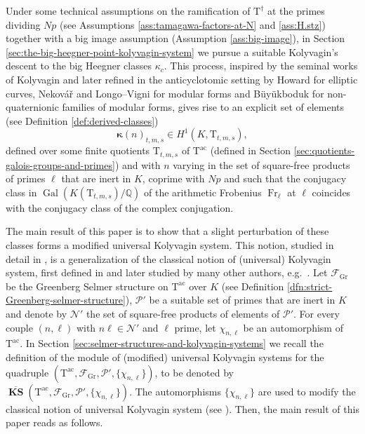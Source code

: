 \documentclass[12pt,reqno]{amsart}
\theoremstyle{definition}
\theoremstyle{remark}
\newcommand{\numberset}{\mathbb}
\newcommand{\Q}{\numberset{Q}}
\newcommand{\T}{\boldsymbol{\mathrm{T}}}
\DeclareMathOperator{\Gal}{Gal}
\DeclareMathOperator{\Fr}{Fr}
\DeclareMathOperator{\ks}{KS}
\newcommand{\KS}{\boldsymbol{\ks}}
\newcommand{\ac}{\mathrm{ac}}
\newcommand{\Gr}{\mathrm{Gr}}
\newcommand{\gk}{\kappa}
\begin{document}
Under some technical assumptions on the ramification of $\T^\dag$ at the primes dividing $Np$ (see Assumptions \ref{ass:tamagawa-factors-at-N} and \ref{ass:H.stz}) together with a big image assumption (Assumption \ref{ass:big-image}), in Section \ref{sec:the-big-heegner-point-kolyvagin-system} we pursue a suitable Kolyvagin's descent to the big Heegner classes $\kappa_c$. This process, inspired by the seminal works of Kolyvagin \cite{Kolyvagin:euler-systems, Kolyvagin:finiteness-of-E-and-sha, Kolyvagin-Logachev:finiteness-of-Sha} and later refined in the anticyclotomic setting by Howard \cite{Howard04:heegner-point-kolyvagin-system} for elliptic curves, Nekov{\'a}{\v{r}} \cite{Nekovar92:chow-groups} and Longo--Vigni \cite{Longo-Vigni:kolyvagin-systems-Heegner-cycles} for modular forms and B{\"u}y{\"u}kboduk \cite{Buyukboduk:big-Heegner-point-kolyvagin-system} for non-quaternionic families of modular forms, gives rise to an explicit set of elements (see Definition \ref{def:derived-classes})
\begin{equation}\label{eq:introduction-classes}
    \boldsymbol{\gk}(n)_{t,m,s}\in H^1(K,\T_{t,m,s}),
\end{equation}
defined over some finite quotients $\T_{t,m,s}$ of $\T^\ac$ (defined in Section \ref{sec:quotients-galois-groups-and-primes}) and with $n$ varying in the set of square-free products of primes $\ell$ that are inert in $K$, coprime with $Np$ and such that the conjugacy class in $\Gal(K(\T_{t,m,s})/\Q)$ of the arithmetic Frobenius $\Fr_\ell$ at $\ell$ coincides with the conjugacy class of the complex conjugation.

The main result of this paper is to show that a slight perturbation of these classes forms a modified universal Kolyvagin system. This notion, studied in detail in \cite{mastella-zerman2025:anticyclotomic}, is a generalization of the classical notion of (universal) Kolyvagin system, first defined in \cite{Mazur-Rubin:Kolyvagin-systems} and later studied by many other authors, e.g.~\cite{Howard04:heegner-point-kolyvagin-system, Buyukboduk:deformations-of-kolyvagin-systems}. Let $\mathcal{F}_\Gr$ be the Greenberg Selmer structure on $\T^\ac$ over $K$ (see Definition \ref{dfn:strict-Greenberg-selmer-structure}), $\mathcal{P}'$ be a suitable set of primes that are inert in $K$ and denote by $\mathcal{N}'$ the set of square-free products of elements of $\mathcal{P}'$. For every couple $(n,\ell)$ with $n\ell\in\mathcal{N}'$ and $\ell$ prime, let $\chi_{n,\ell}$ be an automorphism of $\T^\ac$. In Section \ref{sec:selmer-structures-and-kolyvagin-systems} we recall the definition of the module of (modified) universal Kolyvagin systems for the quadruple $(\T^\ac,\mathcal{F}_\Gr,\mathcal{P}',\{\chi_{n,\ell}\})$, to be denoted by $\overline{\KS}(\T^\ac,\mathcal{F}_\Gr,\mathcal{P}',\{\chi_{n,\ell}\})$. The automorphisms $\{\chi_{n,\ell}\}$ are used to modify the classical notion of universal Kolyvagin system (see \cite[Definition 3.4]{Buyukboduk:deformations-of-kolyvagin-systems}). Then, the main result of this paper reads as follows.
\end{document}
